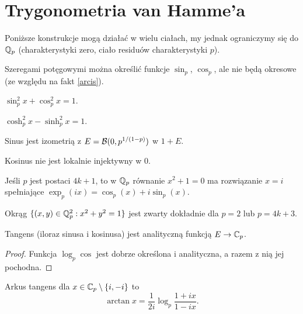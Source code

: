 \section{Trygonometria van Hamme'a}
Poniższe konstrukcje mogą działać w wielu ciałach, my jednak ograniczymy się do $\mathbb Q_p$ (charakterystyki zero, ciało residuów charakterystyki $p$).

Szeregami potęgowymi można określić funkcje $\sin_p$, $\cos_p$, ale nie będą okresowe (ze względu na fakt \ref{arcis}).

\begin{fakt}
	$\sin_p^2x + \cos_p^2x = 1$. 
\end{fakt}

\begin{fakt}
	$\cosh_p^2x - \sinh_p^2x = 1$.
\end{fakt}

\begin{fakt}
	Sinus jest izometrią z $E = \mathcal B(0, p^{1/(1-p)})$ w $1 + E$.
\end{fakt}

\begin{fakt}
	Kosinus nie jest lokalnie injektywny w $0$.
\end{fakt}

\begin{fakt}
	Jeśli  $p$ jest postaci $4k + 1$, to w $\mathbb Q_p$ równanie $x^2 + 1 = 0$ ma rozwiązanie $x = i$ spełniające $\exp_p(ix) = \cos_p(x) + i \sin_p(x)$.
\end{fakt}

\begin{wniosek}
	Okrąg $\{(x,y) \in \mathbb Q_p^2 : x^2 + y^2 = 1\}$ jest zwarty dokładnie dla $p = 2$ lub $p = 4k+3$.
\end{wniosek}

\begin{fakt}
	Tangens  (iloraz sinusa i kosinusa) jest analityczną funkcją $E \to \mathbb C_p$.
\end{fakt}

\begin{proof}
	Funkcja $\log_p \cos$ jest dobrze określona i analityczna, a razem z nią jej pochodna.
\end{proof}

\begin{definicja}
	Arkus tangens dla $x \in \mathbb C_p \setminus \{i, -i\}$ to
	\[
		\arctan x = \frac 1{2i} \log_p \frac{1 + ix}{1 - ix}.
	\]
\end{definicja}

